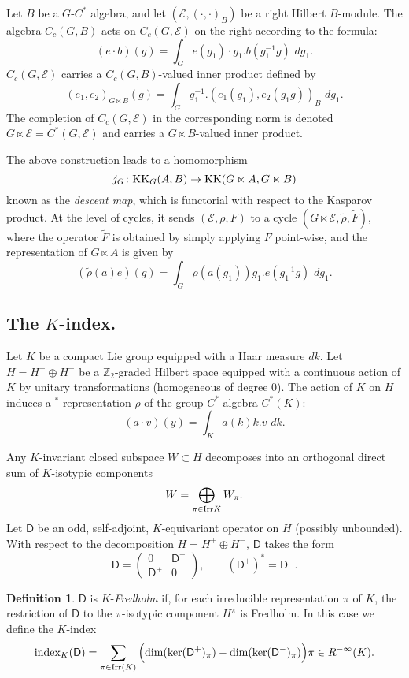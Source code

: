 \documentclass[11pt,reqno]{amsart}
\theoremstyle{definition}
\newtheorem{definition}[theorem]{Definition}
\theoremstyle{remark}
\newcommand{\ti}[1]{\widetilde{#1}}
\newcommand{\st}[1]{\mathsf{#1}}
\newcommand{\tn}[1]{\textnormal{#1}}
\def\E{\ensuremath{\mathcal{E}}}
\def\bZ{\ensuremath{\mathbb{Z}}}
\def\ker{\ensuremath{\textnormal{ker}}}
\def\index{\ensuremath{\textnormal{index}}}
\def\dim{\ensuremath{\textnormal{dim}}}
\def\KK{\ensuremath{\textnormal{KK}}}
\def\Irr{\ensuremath{\tn{Irr}}}
\begin{document}
Let $B$ be a $G$-$C^\ast$ algebra, and let $(\E,(\cdot,\cdot)_B)$ be a right Hilbert $B$-module.  The algebra $C_c(G,B)$ acts on $C_c(G,\E)$ on the right according to the formula:
\[ (e\cdot b)(g)=\int_G e(g_1)\cdot g_1.b(g_1^{-1}g)\,\,dg_1.\]
$C_c(G,\E)$ carries a $C_c(G,B)$-valued inner product defined by
\[ (e_1,e_2)_{G\ltimes B}(g)=\int_G g_1^{-1}.(e_1(g_1),e_2(g_1g))_B\,\,dg_1. \]
The completion of $C_c(G,\E)$ in the corresponding norm is denoted $G \ltimes \E=C^\ast(G,\E)$ and carries a $G \ltimes B$-valued inner product.

The above construction leads to a homomorphism
\[ j_G \colon \KK_G(A,B) \rightarrow \KK(G\ltimes A,G\ltimes B) \]
known as the \emph{descent map}, which is functorial with respect to the Kasparov product.  At the level of cycles, it sends $(\E,\rho,F)$ to a cycle $(G\ltimes \E,\ti{\rho},\ti{F})$, where the operator $\ti{F}$ is obtained by simply applying $F$ point-wise, and the representation of $G\ltimes A$ is given by
\[ (\ti{\rho}(a) e)(g)=\int_G \rho(a(g_1))g_1.e(g_1^{-1}g)\,\,dg_1.\]

\subsection{The $K$-index.}
Let $K$ be a compact Lie group equipped with a Haar measure $dk$.  Let $H=H^+\oplus H^-$ be a $\bZ_2$-graded Hilbert space equipped with a continuous action of $K$ by unitary transformations (homogeneous of degree $0$).  The action of $K$ on $H$ induces a $^\ast$-representation $\rho$ of the group $C^\ast$-algebra $C^\ast(K)$:
\[(a\cdot v)(y)=\int_K a(k) k.v\,\,dk.\]

Any $K$-invariant closed subspace $W \subset H$ decomposes into an orthogonal direct sum of $K$-isotypic components
\[ W=\bigoplus_{\pi \in \Irr{K}} W_\pi.\]
Let $\st{D}$ be an odd, self-adjoint, $K$-equivariant operator on $H$ (possibly unbounded).  With respect to the decomposition $H=H^+\oplus H^-$, $\st{D}$ takes the form
\[ \st{D}=\left(\begin{array}{cc} 0 & \st{D}^-\\ \st{D}^+ & 0\end{array}\right), \qquad (\st{D}^+)^\ast=\st{D}^-.\]
\begin{definition}
\label{def:Kindex}
$\st{D}$ is $K$-\emph{Fredholm} if, for each irreducible representation $\pi$ of $K$, the restriction of $\st{D}$ to the $\pi$-isotypic component $H^{\pi}$ is Fredholm.  In this case we define the $K$-index
\[ \index_K(\st{D})=\sum_{\pi \in \Irr(K)} \Big(\dim(\ker(\st{D}^+)_\pi)-\dim(\ker(\st{D}^-)_\pi)\Big)\pi \in R^{-\infty}(K).\]
\end{definition} 
\end{document}
